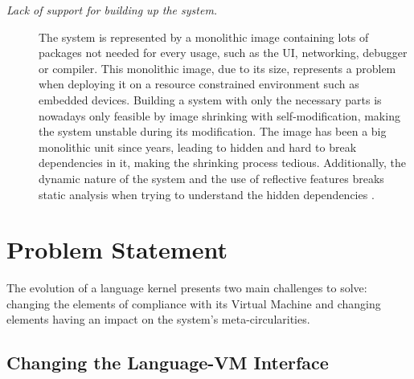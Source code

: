 \begin{description}
\item[\emph{Lack of support for building up the system.}] The system is represented by a monolithic image containing lots of packages not needed for every usage, such as the UI, networking, debugger or compiler. This monolithic image, due to its size, represents a problem when deploying it on a resource constrained environment such as embedded devices. Building a system with only the necessary parts is nowadays only feasible by image shrinking with self-modification, making the system unstable during its modification.
The image has been a big monolithic unit since years, leading to hidden and hard to break dependencies in it, making the shrinking process tedious. Additionally, the dynamic nature of the system and the use of reflective features breaks static analysis when trying to understand the hidden dependencies \cite{Livs05a}.
\end{description}


\section{Problem Statement}


The evolution of a language kernel presents two main challenges to solve: changing the elements of compliance with its Virtual Machine and changing elements having an impact on the system's meta-circularities.

\subsection{Changing the Language-VM Interface}

